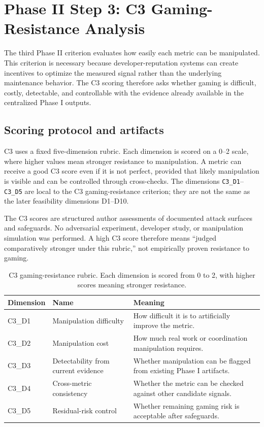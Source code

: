 \section{Phase II Step 3: C3 Gaming-Resistance Analysis}
\label{sec:phase2_c3_gaming_resistance}

The third Phase II criterion evaluates how easily each metric can be manipulated. This criterion is necessary because
developer-reputation systems can create incentives to optimize the measured signal rather than the underlying
maintenance behavior. The C3 scoring therefore asks whether gaming is difficult, costly, detectable, and
controllable with the evidence already available in the centralized Phase I outputs.

\subsection{Scoring protocol and artifacts}
\label{sec:c3_protocol_artifacts}

C3 uses a fixed five-dimension rubric. Each dimension is scored on a 0--2 scale, where higher values mean
stronger resistance to manipulation. A metric can receive a good C3 score even if it is not perfect, provided
that likely manipulation is visible and can be controlled through cross-checks. The dimensions
\texttt{C3\_D1}--\texttt{C3\_D5} are local to the C3 gaming-resistance criterion; they are not the same as
the later feasibility dimensions D1--D10.

The C3 scores are structured author assessments of documented attack surfaces and safeguards. No adversarial experiment,
developer study, or manipulation simulation was performed. A high C3 score therefore means ``judged comparatively stronger
under this rubric,'' not empirically proven resistance to gaming.

\begin{table}[H]
\centering
\scriptsize
\renewcommand{\arraystretch}{1.08}
\begin{tabularx}{\textwidth}{p{2.1cm}p{3.7cm}X}
\toprule
\textbf{Dimension} & \textbf{Name} & \textbf{Meaning} \\
\midrule
C3\_D1 & Manipulation difficulty & How difficult it is to artificially improve the metric. \\
C3\_D2 & Manipulation cost & How much real work or coordination manipulation requires. \\
C3\_D3 & Detectability from current evidence & Whether manipulation can be flagged from existing Phase I artifacts. \\
C3\_D4 & Cross-metric consistency & Whether the metric can be checked against other candidate signals. \\
C3\_D5 & Residual-risk control & Whether remaining gaming risk is acceptable after safeguards. \\
\bottomrule
\end{tabularx}
\caption{C3 gaming-resistance rubric. Each dimension is scored from 0 to 2, with higher scores meaning stronger resistance.}
\label{tab:c3_rubric}
\end{table}

